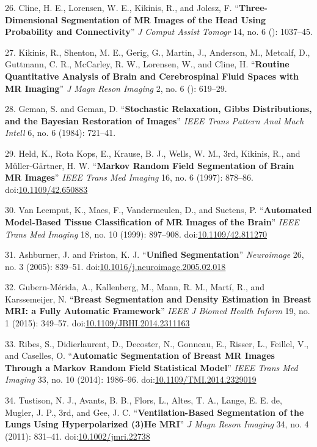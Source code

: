 \documentclass[11pt,]{article}
\begin{document}
26. Cline, H. E., Lorensen, W. E., Kikinis, R., and Jolesz, F.
``\textbf{Three-Dimensional Segmentation of MR Images of the Head Using
Probability and Connectivity}'' \emph{J Comput Assist Tomogr} 14, no. 6
(): 1037--45.

27. Kikinis, R., Shenton, M. E., Gerig, G., Martin, J., Anderson, M.,
Metcalf, D., Guttmann, C. R., McCarley, R. W., Lorensen, W., and Cline,
H. ``\textbf{Routine Quantitative Analysis of Brain and Cerebrospinal
Fluid Spaces with MR Imaging}'' \emph{J Magn Reson Imaging} 2, no. 6 ():
619--29.

28. Geman, S. and Geman, D. ``\textbf{Stochastic Relaxation, Gibbs
Distributions, and the Bayesian Restoration of Images}'' \emph{IEEE
Trans Pattern Anal Mach Intell} 6, no. 6 (1984): 721--41.

29. Held, K., Rota Kops, E., Krause, B. J., Wells, W. M., 3rd, Kikinis,
R., and M{ü}ller-G{ä}rtner, H. W. ``\textbf{Markov Random Field
Segmentation of Brain MR Images}'' \emph{IEEE Trans Med Imaging} 16, no.
6 (1997): 878--86.
doi:\href{http://dx.doi.org/10.1109/42.650883}{10.1109/42.650883}

30. Van Leemput, K., Maes, F., Vandermeulen, D., and Suetens, P.
``\textbf{Automated Model-Based Tissue Classification of MR Images of
the Brain}'' \emph{IEEE Trans Med Imaging} 18, no. 10 (1999): 897--908.
doi:\href{http://dx.doi.org/10.1109/42.811270}{10.1109/42.811270}

31. Ashburner, J. and Friston, K. J. ``\textbf{Unified Segmentation}''
\emph{Neuroimage} 26, no. 3 (2005): 839--51.
doi:\href{http://dx.doi.org/10.1016/j.neuroimage.2005.02.018}{10.1016/j.neuroimage.2005.02.018}

32. Gubern-M{é}rida, A., Kallenberg, M., Mann, R. M., Mart{í}, R., and
Karssemeijer, N. ``\textbf{Breast Segmentation and Density Estimation in
Breast MRI: a Fully Automatic Framework}'' \emph{IEEE J Biomed Health
Inform} 19, no. 1 (2015): 349--57.
doi:\href{http://dx.doi.org/10.1109/JBHI.2014.2311163}{10.1109/JBHI.2014.2311163}

33. Ribes, S., Didierlaurent, D., Decoster, N., Gonneau, E., Risser, L.,
Feillel, V., and Caselles, O. ``\textbf{Automatic Segmentation of Breast
MR Images Through a Markov Random Field Statistical Model}'' \emph{IEEE
Trans Med Imaging} 33, no. 10 (2014): 1986--96.
doi:\href{http://dx.doi.org/10.1109/TMI.2014.2329019}{10.1109/TMI.2014.2329019}

34. Tustison, N. J., Avants, B. B., Flors, L., Altes, T. A., Lange, E.
E. de, Mugler, J. P., 3rd, and Gee, J. C. ``\textbf{Ventilation-Based
Segmentation of the Lungs Using Hyperpolarized (3)He MRI}'' \emph{J Magn
Reson Imaging} 34, no. 4 (2011): 831--41.
doi:\href{http://dx.doi.org/10.1002/jmri.22738}{10.1002/jmri.22738}
\end{document}
